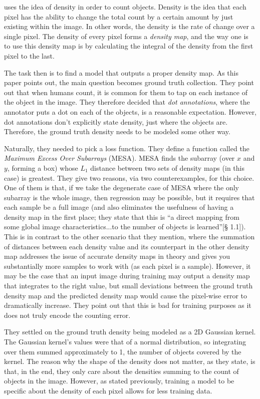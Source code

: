 \cite{learningtocount} uses the idea of density in order to count objects. Density is the idea that
each pixel has the ability to change the total count by a certain amount by just existing within the
image. In other words, the density is the rate of change over a single pixel. The density of every
pixel forms a \textit{density map}, and the way one is to use this density map is by calculating the
integral of the density from the first pixel to the last.

The task then is to find a model that outputs a proper density map. As this paper points out, the
main question becomes ground truth collection. They point out that when humans count, it is common
for them to tap on each instance of the object in the image. They therefore decided that \textit{dot
annotations}, where the annotator puts a dot on each of the objects, is a reasonable expectation.
However, dot annotations don't explicitly state density, just where the objects are. Therefore, the
ground truth density needs to be modeled some other way.

Naturally, they needed to pick a loss function. They define a function called the \textit{Maximum
Excess Over Subarrays} (MESA). MESA finds the subarray (over $x$ and $y$, forming a box) whose $L_1$
distance between two sets of density maps (in this case) is greatest. They give two reasons, via two
counterexamples, for this choice. One of them is that, if we take the degenerate case of MESA where
the only subarray is the whole image, then regression may be possible, but it requires that each
sample be a full image (and also eliminates the usefulness of having a density map in the first
place; they state that this is ``a direct mapping from some global image characteristics...to the
number of objects is learned''\cite{learningtocount}[§ 1.1]). This is in contrast to the other scenario that they
mention, where the summation of distances between each density value and its counterpart in the
other density map addresses the issue of accurate density maps in theory and gives you substantially
more samples to work with (as each pixel is a sample). However, it may be the case that an input
image during training may output a density map that integrates to the right value, but small
deviations between the ground truth density map and the predicted density map would cause the
pixel-wise error to dramatically increase. They point out that this is bad for training purposes as
it does not truly encode the counting error.

They settled on the ground truth density being modeled as a 2D Gaussian kernel. The Gaussian
kernel's values were that of a normal distribution, so integrating over them summed approximately to
1, the number of objects covered by the kernel. The reason why the shape of the density does not matter, as
they state, is that, in the end, they only care about the densities summing to the count of objects
in the image. However, as stated previously, training a model to be specific about the density of
each pixel allows for less training data.

